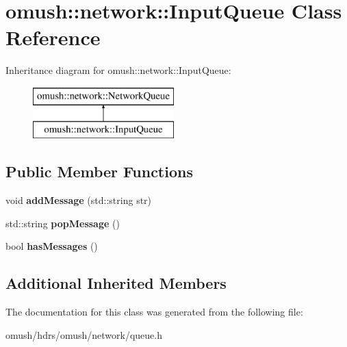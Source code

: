 \hypertarget{classomush_1_1network_1_1_input_queue}{\section{omush\-:\-:network\-:\-:Input\-Queue Class Reference}
\label{classomush_1_1network_1_1_input_queue}
}
Inheritance diagram for omush\-:\-:network\-:\-:Input\-Queue\-:\begin{figure}[H]
\begin{center}
\leavevmode
\includegraphics[height=2.000000cm]{classomush_1_1network_1_1_input_queue}
\end{center}
\end{figure}
\subsection*{Public Member Functions}
\begin{DoxyCompactItemize}
\item 
\hypertarget{classomush_1_1network_1_1_input_queue_a93554014942bdc53d670aaf7cdcd0243}{void {\bfseries add\-Message} (std\-::string str)}\label{classomush_1_1network_1_1_input_queue_a93554014942bdc53d670aaf7cdcd0243}

\item 
\hypertarget{classomush_1_1network_1_1_input_queue_abb45a65e546d5a2f5c30d4ebe7c1f23d}{std\-::string {\bfseries pop\-Message} ()}\label{classomush_1_1network_1_1_input_queue_abb45a65e546d5a2f5c30d4ebe7c1f23d}

\item 
\hypertarget{classomush_1_1network_1_1_input_queue_a23dbddd719f3ceb4390b4526156dc58d}{bool {\bfseries has\-Messages} ()}\label{classomush_1_1network_1_1_input_queue_a23dbddd719f3ceb4390b4526156dc58d}

\end{DoxyCompactItemize}
\subsection*{Additional Inherited Members}


The documentation for this class was generated from the following file\-:\begin{DoxyCompactItemize}
\item 
omush/hdrs/omush/network/queue.\-h\end{DoxyCompactItemize}
